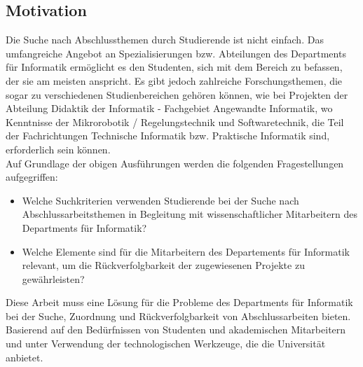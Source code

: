\subsection{Motivation}
Die Suche nach Abschlussthemen durch Studierende ist nicht einfach.  Das umfangreiche Angebot an Spezialisierungen bzw. Abteilungen des Departments f\"ur Informatik erm\"oglicht es den Studenten, sich mit dem Bereich zu befassen, der sie am meisten anspricht. Es gibt jedoch zahlreiche Forschungsthemen, die sogar zu verschiedenen Studienbereichen geh\"oren k\"onnen, wie bei Projekten der Abteilung Didaktik der Informatik - Fachgebiet Angewandte Informatik, wo Kenntnisse der Mikrorobotik / Regelungstechnik und Softwaretechnik, die Teil der Fachrichtungen Technische Informatik bzw. Praktische Informatik sind, erforderlich sein k\"onnen.\\

Auf Grundlage der obigen Ausf\"uhrungen werden die folgenden Fragestellungen aufgegriffen:

\begin{itemize}
	\item Welche Suchkriterien verwenden Studierende bei der Suche nach Abschlussarbeitsthemen in Begleitung mit wissenschaftlicher Mitarbeitern des Departments f\"ur Informatik?
	
	\item Welche Elemente sind f\"ur die Mitarbeitern des Departements f\"ur Informatik relevant, um die R\"uckverfolgbarkeit der zugewiesenen Projekte zu gew\"ahrleisten?
\end{itemize}

Diese Arbeit muss eine L\"osung f\"ur die Probleme des Departments f\"ur Informatik bei der Suche, Zuordnung und R\"uckverfolgbarkeit von Abschlussarbeiten bieten. Basierend auf den Bed\"urfnissen von Studenten und akademischen Mitarbeitern und unter Verwendung der technologischen Werkzeuge, die die Universit\"at anbietet.